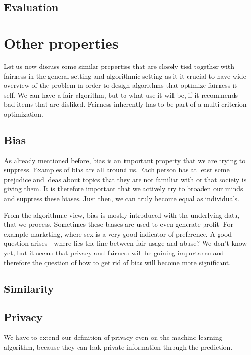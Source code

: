 \subsection{Evaluation} \label{sec:02_evaluation}


\section{Other properties} \label{sec:02_other_properties}
Let us now discuss some similar properties that are closely tied together with fairness in the general setting and algorithmic setting as it it crucial to have wide overview of the problem in order to design algorithms that optimize fairness it self. We can have a fair algorithm, but to what use it will be, if it recommends bad items that are disliked. Fairness inherently has to be part of a multi-criterion optimization.

\subsection{Bias}
As already mentioned before, bias is an important property that we are trying to suppress. Examples of bias are all around us. Each person has at least some prejudice and ideas about topics that they are not familiar with or that society is giving them. It is therefore important that we actively try to broaden our minds and suppress these biases. Just then, we can truly become equal as individuals.

From the algorithmic view, bias is mostly introduced with the underlying data, that we process. Sometimes these biases are used to even generate profit. For example marketing, where sex is a very good indicator of preference. A good question arises - where lies the line between fair usage and abuse? We don't know yet, but it seems that privacy and fairness will be gaining importance and therefore the question of how to get rid of bias will become more significant.


\subsection{Similarity}


\subsection{Privacy}
We have to extend our definition of privacy even on the machine learning algorithm, because they can leak private information through the prediction. 
